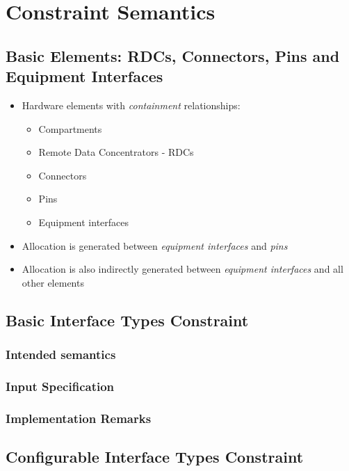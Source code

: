
\chapter{Constraint Semantics}
\label{cha:constraint-semantics}

\section{Basic Elements: RDCs, Connectors, Pins and Equipment Interfaces}
\label{sec:basic-elements}

\begin{itemize}
\item Hardware elements with \emph{containment} relationships:
  \begin{itemize}
  \item Compartments
  \item Remote Data Concentrators - RDCs
  \item Connectors
  \item Pins
  \item Equipment interfaces
  \end{itemize}
\item Allocation is generated between \emph{equipment interfaces} and \emph{pins}
\item Allocation is also indirectly generated between \emph{equipment interfaces} and all other elements
\end{itemize}

\section{Basic Interface Types Constraint}
\label{sec:basic-interf-types}

\subsection{Intended semantics}

\subsection{Input Specification}

\subsection{Implementation Remarks}

\section{Configurable Interface Types Constraint}
\label{sec:conf-interf-types}

